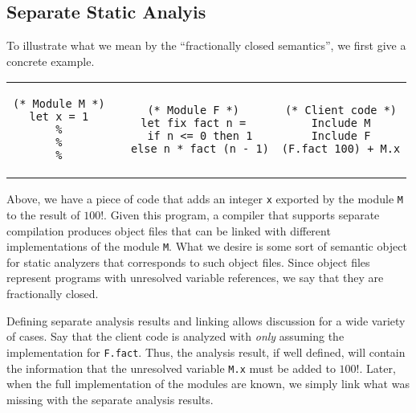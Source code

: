\documentclass[acmsmall,screen,review]{acmart}\settopmatter{printfolios=true,printccs=false,printacmref=false}
\begin{document}
\subsection{Separate Static Analyis}
To illustrate what we mean by the ``fractionally closed semantics'', we first give a concrete example.
\begin{center}
  \begin{tabular}{ccc}
    \begin{minipage}{0.3\linewidth}
      \begin{lstlisting}[language=Coq]
(* Module M *)
let x = 1
%
%
%
    \end{lstlisting}
    \end{minipage} &
    \begin{minipage}{0.3\linewidth}
      \begin{lstlisting}[language=Coq]
(* Module F *)
let fix fact n =
  if n <= 0 then 1
  else n * fact (n - 1)
    \end{lstlisting}
    \end{minipage}      &
    \begin{minipage}{0.3\linewidth}
      \begin{lstlisting}[language=Coq]
(* Client code *)
Include M
Include F
(F.fact 100) + M.x
    \end{lstlisting}
    \end{minipage}
  \end{tabular}
\end{center}

Above, we have a piece of code that adds an integer \texttt{x} exported by the module \texttt{M} to the result of $100!$.
Given this program, a compiler that supports separate compilation produces object files that can be linked with different implementations of the module \texttt{M}.
What we desire is some sort of semantic object for static analyzers that corresponds to such object files.
Since object files represent programs with unresolved variable references, we say that they are fractionally closed.

Defining separate analysis results and linking allows discussion for a wide variety of cases.
Say that the client code is analyzed with \emph{only} assuming the implementation for \texttt{F.fact}.
Thus, the analysis result, if well defined, will contain the information that the unresolved variable \texttt{M.x} must be added to $100!$.
Later, when the full implementation of the modules are known, we simply link what was missing with the separate analysis results.
\end{document}
